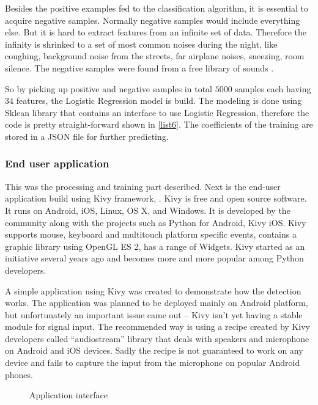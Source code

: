 Besides the positive examples fed to the classification algorithm, it is essential to acquire negative samples. Normally negative samples would include everything else. But it is hard to extract features from an infinite set of data. Therefore the infinity is shrinked to a set of most common noises during the night, like coughing, background noise from the streets, far airplane noises, sneezing, room silence. The negative samples were found from a free library of sounds \cite{freesounds}.

So by picking up positive and negative samples in total $5000$ samples each having $34$ features, the Logistic Regression model is build. The modeling is done using Sklean library that contains an interface to use Logistic Regression, therefore the code is pretty straight-forward shown in \ref{list6}. The coefficients of the training are stored in a JSON file for further predicting.



\subsubsection{End user application}
This was the processing and training part described. Next is the end-user application build using Kivy framework, \cite{kivy}. Kivy is free and open source software. It runs on Android, iOS, Linux, OS X, and Windows. It is developed by the community along with the projects such as Python for Android, Kivy iOS. Kivy supports mouse, keyboard and multitouch platform specific events, contains a graphic library using OpenGL ES 2, has a range of Widgets. Kivy started as an initiative several years ago and becomes more and more popular among Python developers.

A simple application using Kivy was created to demonstrate how the detection works. The application was planned to be deployed mainly on Android platform, but unfortunately an important issue came out -- Kivy isn't yet having a stable module for signal input. The recommended way is using a recipe created by Kivy developers called ``audiostream'' library that deals with speakers and microphone on Android and iOS devices. Sadly the recipe is not guaranteed to work on any device and fails to capture the input from the microphone on popular Android phones.

\begin{figure}[!ht]
  \centering
  \vspace{0.08cm}
  \caption{Application interface}
  \label{fig:screens}
\end{figure}

